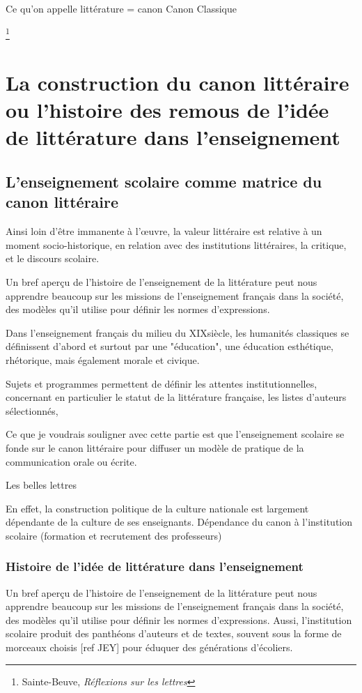 Ce qu'on appelle littérature = canon
Canon 
Classique

\footnote{Sainte-Beuve, \textit{Réflexions sur les lettres}}

\chapter{La construction du canon littéraire ou l'histoire des remous de l'idée de littérature dans l'enseignement}

\section{L'enseignement scolaire comme matrice du canon littéraire}
Ainsi loin d’être immanente à l’œuvre, la valeur littéraire est relative à un moment socio-historique, en relation avec des institutions littéraires, la critique, et le discours scolaire.

Un bref aperçu de l'histoire de l'enseignement de la littérature peut nous apprendre beaucoup sur les missions de l'enseignement français dans la société, des modèles qu'il utilise pour définir les normes d'expressions.

Dans l'enseignement français du milieu du XIX\ieme siècle, les humanités classiques se définissent d'abord et surtout par une "éducation", une éducation esthétique, rhétorique, mais également morale et civique.

Sujets et programmes permettent de définir les attentes institutionnelles, concernant en particulier le statut de la littérature française, les listes d’auteurs sélectionnés, 

Ce que je voudrais souligner avec cette partie est que l'enseignement scolaire se fonde sur le canon littéraire pour diffuser un modèle de pratique de la communication orale ou écrite. 

Les belles lettres

En effet, la construction politique de la culture nationale est largement dépendante de la culture de ses enseignants. Dépendance du canon à l'institution scolaire (formation et recrutement des professeurs)

\subsection{Histoire de l'idée de littérature dans l'enseignement}
Un bref aperçu de l'histoire de l'enseignement de la littérature peut nous apprendre beaucoup sur les missions de l'enseignement français dans la société, des modèles qu'il utilise pour définir les normes d'expressions. Aussi, l'institution scolaire produit des panthéons d'auteurs et de textes, souvent sous la forme de morceaux choisis [ref JEY] pour éduquer des générations d'écoliers.

